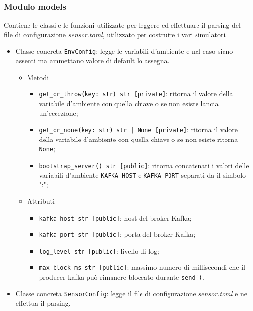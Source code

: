 \subsubsection{Modulo models}
Contiene le classi e le funzioni utilizzate per leggere ed effettuare il parsing del file di configurazione \textit{sensor.toml}, utilizzato per costruire i vari simulatori.
\begin{itemize}
    \item Classe concreta \texttt{EnvConfig}: legge le variabili d'ambiente e nel caso siano assenti ma ammettano valore di default lo assegna. 
    \begin{itemize}
        \item Metodi
        \begin{itemize}
            \item \texttt{get\_or\_throw(key: str) str [private]}: ritorna il valore della variabile d'ambiente con quella chiave o se non esiste lancia un'eccezione;
            \item \texttt{get\_or\_none(key: str) str | None [private]}: ritorna il valore della variabile d'ambiente con quella chiave o se non esiste ritorna \texttt{None};
            \item \texttt{bootstrap\_server() str [public]}: ritorna concatenati i valori delle variabili d'ambiente \texttt{KAFKA\_HOST} e \texttt{KAFKA\_PORT} separati da il simbolo ":";
        \end{itemize}
        \item Attributi
        \begin{itemize}
            \item \texttt{kafka\_host str [public]}: host del broker Kafka;
            \item \texttt{kafka\_port str [public]}: porta del broker Kafka;
            \item \texttt{log\_level str [public]}: livello di log;
            \item \texttt{max\_block\_ms str [public]}: massimo numero di millisecondi che il producer kafka può rimanere bloccato durante \texttt{send()}.
        \end{itemize}
    \end{itemize}
    \item Classe concreta \texttt{SensorConfig}: legge il file di configurazione \textit{sensor.toml} e ne effettua il parsing.

\end{itemize}
